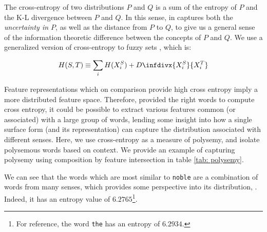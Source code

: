 \documentclass[11pt]{book}
\newcommand{\infdiv}{D\infdivx}
\newcommand{\citep}[1]{\cite{#1}}
\begin{document}
The cross-entropy of two distributions $P$ and $Q$ is a sum of the entropy of
$P$ and the K-L divergence between $P$ and $Q$. In this sense, in captures both
the \emph{uncertainty in $P$}, as well as the distance from $P$ to $Q$, to give
us a general sense of the information theoretic difference between the concepts
of $P$ and $Q$. We use a generalized version of cross-entropy to fuzzy sets
\citep{li2015fuzzy}, which is:

\begin{equation*}
   H(S, T) \equiv \sum_i H(X^S_i) + \infdiv{X^S_i}{X^T_i}
\end{equation*}

Feature representations which on comparison provide high cross entropy imply a
more distributed feature space. Therefore, provided the right words to compute
cross entropy, it could be possible to extract various features common (or
associated) with a large group of words, lending some insight into how a single
surface form (and its representation) can capture the distribution associated
with different senses. Here, we use cross-entropy as a measure of polysemy, and
isolate polysemous words based on context. We provide an example of capturing
polysemy using composition by feature intersection in table \ref{tab:
polysemy}.

We can see that the words which are most similar to \texttt{noble} are a
combination of words from many senses, which provides some perspective into its
distribution, . Indeed, it has an entropy value of $6.2765$\footnote{For
reference, the word \texttt{the} has an entropy of $6.2934$.}.
\end{document}
